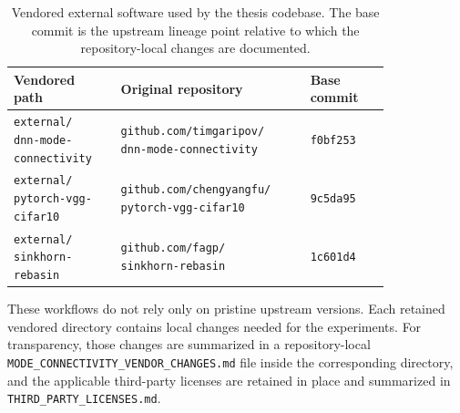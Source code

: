\documentclass[11pt,a4paper]{report}
\begin{document}
\begin{table}[H]
\centering
\small
\begin{tabular}{p{0.24\linewidth}p{0.40\linewidth}p{0.18\linewidth}}
\toprule
\textbf{Vendored path} & \textbf{Original repository} & \textbf{Base commit} \\
\midrule
\shortstack[l]{\texttt{external/}\\\texttt{dnn-mode-connectivity}} &
\shortstack[l]{\texttt{github.com/timgaripov/}\\\texttt{dnn-mode-connectivity}} &
\texttt{f0bf253} \\
\shortstack[l]{\texttt{external/}\\\texttt{pytorch-vgg-cifar10}} &
\shortstack[l]{\texttt{github.com/chengyangfu/}\\\texttt{pytorch-vgg-cifar10}} &
\texttt{9c5da95} \\
\shortstack[l]{\texttt{external/}\\\texttt{sinkhorn-rebasin}} &
\shortstack[l]{\texttt{github.com/fagp/}\\\texttt{sinkhorn-rebasin}} &
\texttt{1c601d4} \\
\bottomrule
\end{tabular}
\caption{Vendored external software used by the thesis codebase. The base commit is the upstream lineage point relative to which the repository-local changes are documented.}
\label{tab:software_provenance}
\end{table}

These workflows do not rely only on pristine upstream versions. Each retained
vendored directory contains local changes needed for the experiments. For
transparency, those changes are summarized in a repository-local
\texttt{MODE\_CONNECTIVITY\_VENDOR\_CHANGES.md} file inside the corresponding
directory, and the applicable third-party licenses are retained in place and
summarized in \texttt{THIRD\_PARTY\_LICENSES.md}.
\end{document}
